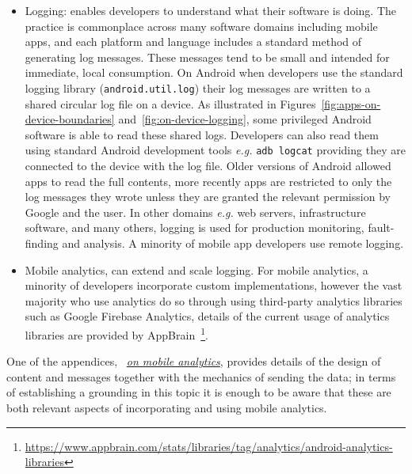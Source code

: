 \begin{itemize}
    \item Logging: enables developers to understand what their software is doing. The practice is commonplace across many software domains including mobile apps, and each platform and language includes a standard method of generating log messages. These messages tend to be small and intended for immediate, local consumption. On Android when developers use the standard logging library (\texttt{android.util.log}) their log messages are written to a shared circular log file on a device. As illustrated in Figures~\ref{fig:apps-on-device-boundaries} and~\ref{fig:on-device-logging}, some privileged Android software is able to read these shared logs. Developers can also read them using standard Android development tools \emph{e.g.} \texttt{adb logcat} providing they are connected to the device with the log file. Older versions of Android allowed apps to read the full contents, more recently apps are restricted to only the log messages they wrote unless they are granted the relevant permission by Google and the user. 
    In other domains \emph{e.g.} web servers, infrastructure software, and many others, logging is used for production monitoring, fault-finding and analysis. A minority of mobile app developers use remote logging.
    \item Mobile analytics, can extend and scale logging. For mobile analytics, a minority of developers incorporate custom implementations, however the vast majority who use analytics do so through using third-party analytics libraries such as Google Firebase Analytics, details of the current usage of analytics libraries are provided by AppBrain~\footnote{\url{https://www.appbrain.com/stats/libraries/tag/analytics/android-analytics-libraries}}.
\end{itemize}

One of the appendices, ~\href{app:on-mobile-analytics}{\textit{on mobile analytics}}, provides details of the design of content and messages together with the mechanics of sending the data; in terms of establishing a grounding in this topic it is enough to be aware that these are both relevant aspects of incorporating and using mobile analytics.


